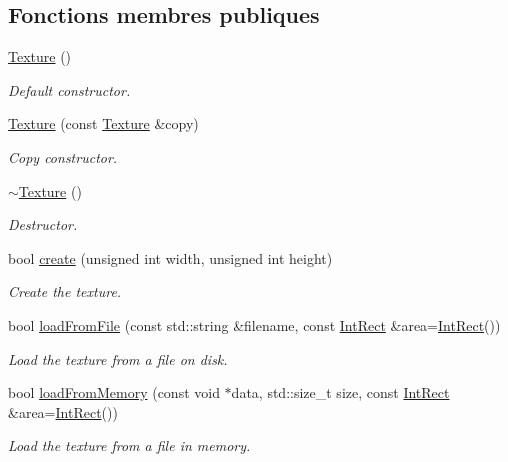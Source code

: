\subsection*{Fonctions membres publiques}
\begin{DoxyCompactItemize}
\item 
\hyperlink{classsf_1_1Texture_a3e04674853b8533bf981db3173e3a4a7}{Texture} ()
\begin{DoxyCompactList}\small\item\em Default constructor. \end{DoxyCompactList}\item 
\hyperlink{classsf_1_1Texture_a524855cbf89de3b74be84d385fd229de}{Texture} (const \hyperlink{classsf_1_1Texture}{Texture} \&copy)
\begin{DoxyCompactList}\small\item\em Copy constructor. \end{DoxyCompactList}\item 
\mbox{\label{classsf_1_1Texture_a9c5354ad40eb1c5aeeeb21f57ccd7e6c}} 
\hyperlink{classsf_1_1Texture_a9c5354ad40eb1c5aeeeb21f57ccd7e6c}{$\sim$\+Texture} ()
\begin{DoxyCompactList}\small\item\em Destructor. \end{DoxyCompactList}\item 
bool \hyperlink{classsf_1_1Texture_a89b4c7d204acf1033c3a1b6e0a3ad0a3}{create} (unsigned int width, unsigned int height)
\begin{DoxyCompactList}\small\item\em Create the texture. \end{DoxyCompactList}\item 
bool \hyperlink{classsf_1_1Texture_a8e1b56eabfe33e2e0e1cb03712c7fcc7}{load\+From\+File} (const std\+::string \&filename, const \hyperlink{classsf_1_1Rect}{Int\+Rect} \&area=\hyperlink{classsf_1_1Rect}{Int\+Rect}())
\begin{DoxyCompactList}\small\item\em Load the texture from a file on disk. \end{DoxyCompactList}\item 
bool \hyperlink{classsf_1_1Texture_a2c4adb19dd4cbee0a588eeb85e52a249}{load\+From\+Memory} (const void $\ast$data, std\+::size\+\_\+t size, const \hyperlink{classsf_1_1Rect}{Int\+Rect} \&area=\hyperlink{classsf_1_1Rect}{Int\+Rect}())
\begin{DoxyCompactList}\small\item\em Load the texture from a file in memory. \end{DoxyCompactList}\item 

\end{DoxyCompactItemize}
